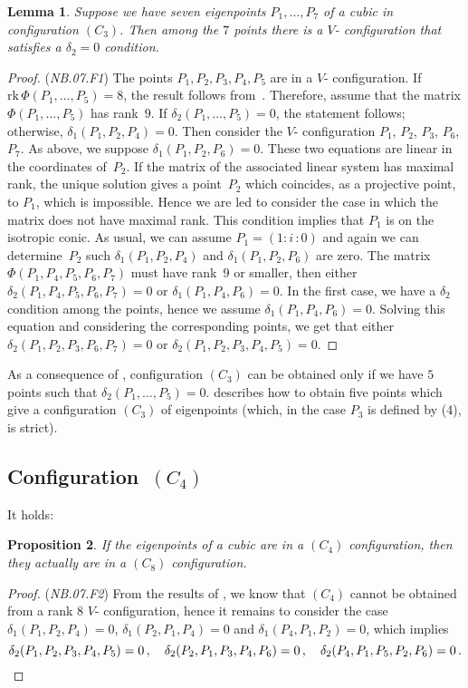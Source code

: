 \documentclass[a4paper, 11pt, reqno]{amsart}
\theoremstyle{plain}
\newtheorem{lemma}{Lemma}[section]
\newtheorem{prop}[lemma]{Proposition}
\theoremstyle{definition}
\newcommand{\nb}[2]{\textsl{{NB}.{#1}.{#2}}}
\newcommand{\iii}{\textit{i}\,}
\newcommand{\rk}{\ensuremath{\mathrm{rk}}}
\begin{document}
\begin{lemma}
\label{no_delta1_delta1} Suppose we have seven eigenpoints $P_1, \dots, P_7$
of a cubic in configuration $(C_3)$. Then among the $7$ points there is a
$V$- configuration that satisfies a $\delta_2 = 0$ condition.
\end{lemma}
\begin{proof} (\nb{07}{F1})
The points $P_1, P_2, P_3, P_4, P_5$ are in a $V$- configuration.
If $\rk \, \Phi(P_1, \dots, P_5) = 8$, the result follows from~.
Therefore, assume that the matrix $\Phi(P_1, \dots, P_5)$ has rank~$9$.
If $\delta_2(P_1, \dots, P_5) = 0$, the statement follows;
otherwise, $\delta_1(P_1, P_2, P_4) = 0$.
Then consider the $V$- configuration $P_1$, $P_2$, $P_3$, $P_6$, $P_7$.
As above, we suppose $\delta_1(P_1, P_2, P_6) = 0$.
These two equations are
linear in the coordinates of~$P_2$.
If the matrix of the associated linear system has
maximal rank, the unique solution gives a point~$P_2$ which coincides, as a projective point, to $P_1$, which is impossible.
Hence we are led to consider the
case in which the matrix does not have maximal rank.
This condition implies that $P_1$ is on the
isotropic conic. As usual, we can assume 
$P_1 = (1: \iii: 0)$ and again
we can determine~$P_2$ such $\delta_1(P_1, P_2, P_4)$ and
$\delta_1(P_1, P_2, P_6)$ are zero. The matrix $\Phi(P_1, P_4, P_5, P_6, P_7)$
must have rank~$9$ or smaller, then either
$\delta_2(P_1, P_4, P_5, P_6, P_7)=0$ or $\delta_1(P_1, P_4, P_6) = 0$. In
the first case, we have a $\delta_2$ condition among the points, hence
we assume $\delta_1(P_1, P_4, P_6) = 0$. Solving this equation and
considering the corresponding points, we get that either
$\delta_2(P_1, P_2, P_3, P_6, P_7) = 0$ or
$\delta_2(P_1, P_2, P_3, P_4, P_5) = 0$.
\end{proof}

As a consequence of , configuration $(C_3)$ can
be obtained only if we have $5$ points such that
$\delta_2(P_1, \dotsc, P_5) = 0$.  describes how to
obtain five points which give a configuration $(C_3)$ of eigenpoints (which, in the case $P_3$  is defined by (4), is strict).

\subsection*{Configuration~\texorpdfstring{$(C_4)$}{C4}}
It holds:
\begin{prop}
\label{conf4no} If the eigenpoints of a cubic are in a $(C_4)$ configuration, then they actually are in a $(C_8)$ configuration.
\end{prop}
\begin{proof} (\nb{07}{F2})
From the results of , we know that $(C_4)$
cannot be obtained from a rank 8 $V$- configuration,
hence it remains to consider the case $\delta_1(P_1, P_2, P_4) = 0$,
$\delta_1(P_2, P_1, P_4) = 0$ and $\delta_1(P_4, P_1, P_2) = 0$,
which implies
%
\[
  \delta_2(P_1, P_2, P_3, P_4, P_5) = 0 \,, \quad
  \delta_2(P_2, P_1, P_3, P_4, P_6) = 0 \,, \quad
  \delta_2(P_4, P_1, P_5, P_2, P_6) = 0 \,. \qedhere
\]
%
\end{proof}
\end{document}
